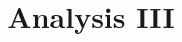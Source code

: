 \title{Analysis III}
\pretitle{\pagestyle{empty}\begin{center}  \Huge \bfseries}
	\renewcommand{\maketitlehookb}{\centering \Large  \textit{Vorlesungsmitschriften im Wintersemester 2018/19}}
\date{}
